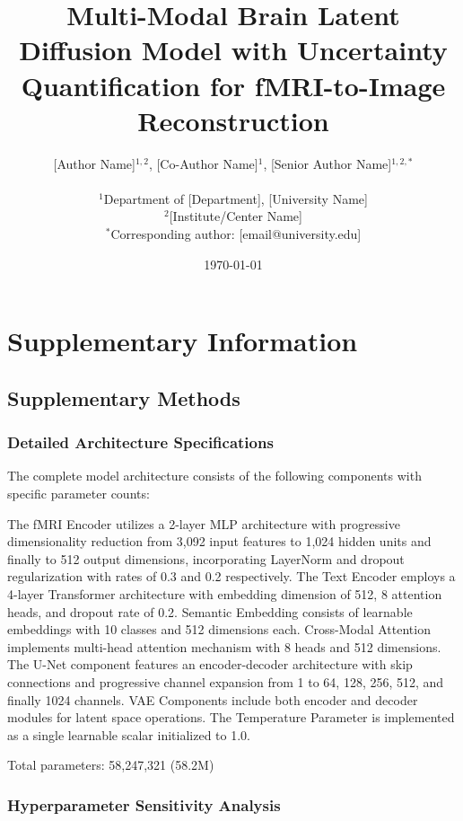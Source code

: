 \documentclass[11pt,a4paper]{article}
\title{\textbf{Multi-Modal Brain Latent Diffusion Model with Uncertainty Quantification for fMRI-to-Image Reconstruction}}
\author{
[Author Name]$^{1,2}$, [Co-Author Name]$^{1}$, [Senior Author Name]$^{1,2,*}$ \\
\\
$^1$Department of [Department], [University Name] \\
$^2$[Institute/Center Name] \\
$^*$Corresponding author: [email@university.edu]
}
\date{\today}
\begin{document}
\maketitle










\newpage
\section*{Supplementary Information}

\subsection*{Supplementary Methods}

\subsubsection*{Detailed Architecture Specifications}

The complete model architecture consists of the following components with specific parameter counts:

The fMRI Encoder utilizes a 2-layer MLP architecture with progressive dimensionality reduction from 3,092 input features to 1,024 hidden units and finally to 512 output dimensions, incorporating LayerNorm and dropout regularization with rates of 0.3 and 0.2 respectively. The Text Encoder employs a 4-layer Transformer architecture with embedding dimension of 512, 8 attention heads, and dropout rate of 0.2. Semantic Embedding consists of learnable embeddings with 10 classes and 512 dimensions each. Cross-Modal Attention implements multi-head attention mechanism with 8 heads and 512 dimensions. The U-Net component features an encoder-decoder architecture with skip connections and progressive channel expansion from 1 to 64, 128, 256, 512, and finally 1024 channels. VAE Components include both encoder and decoder modules for latent space operations. The Temperature Parameter is implemented as a single learnable scalar initialized to 1.0.

Total parameters: 58,247,321 (58.2M)

\subsubsection*{Hyperparameter Sensitivity Analysis}
\end{document}

